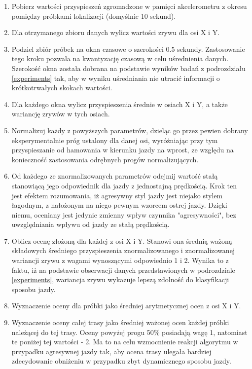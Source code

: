 \begin{enumerate}
\item Pobierz wartości przyspieszeń zgromadzone w pamięci akcelerometru z okresu pomiędzy próbkami lokalizacji (domyślnie 10 sekund).
\item Dla otrzymanego zbioru danych wylicz wartości zrywu dla osi X i Y.
\item Podziel zbiór próbek na okna czasowe o szerokości 0.5 sekundy. Zastosowanie tego kroku pozwala na kwantyzację czasową w celu uśrednienia danych. Szerokość okna została dobrana na podstawie wyników badań z podrozdziału \ref{experiments} tak, aby w wyniku uśredniania nie utracić informacji o krótkotrwałych skokach wartości.
\item Dla każdego okna wylicz przyspieszenia średnie w osiach X i Y, a także wariancję zrywów w tych osiach.
\item Normalizuj każdy z powyższych parametrów, dzieląc go przez pewien dobrany eksperymentalnie próg ustalony dla danej osi, wyróżniając przy tym przyspieszanie od hamowania w kierunku jazdy na wprost, ze względu na konieczność zastosowania odrębnych progów normalizujących.
\item Od każdego ze znormalizowanych parametrów odejmij wartość stałą stanowiącą jego odpowiednik dla jazdy z jednostajną prędkością. Krok ten jest efektem rozumowania, iż agresywny styl jazdy jest niejako stylem łagodnym, z nałożonym na niego pewnym wzorcem ostrej jazdy. Dzięki niemu, oceniany jest jedynie zmienny wpływ czynnika "agresywności", bez uwzględniania wpływu od jazdy ze stałą prędkością.
\item Oblicz ocenę złożoną dla każdej z osi X i Y. Stanowi ona średnią ważoną składowych średniego przyspieszenia znormalizowanego i znormalizowanej wariancji zrywu z wagami wynoszącymi odpowiednio 1 i 2. Wynika to z faktu, iż na podstawie obserwacji danych przedstawionych w podrozdziale \ref{experiments}, wariancja zrywu wykazuje lepszą zdolność do klasyfikacji sposobu jazdy.
\item Wyznaczenie oceny dla próbki jako średniej arytmetycznej ocen z osi X i Y.
\item Wyznaczenie oceny całej trasy jako średniej ważonej ocen każdej próbki należącej do tej trasy. Oceny powyżej progu 50\% posiadają wagę 1, natomiast te poniżej tej wartości - 2. Ma to na celu wzmocnienie reakcji algorytmu w przypadku agresywnej jazdy tak, aby ocena trasy ulegała bardziej zdecydowanie obniżeniu w przypadku zbyt dynamicznego sposobu jazdy.
\end{enumerate}

